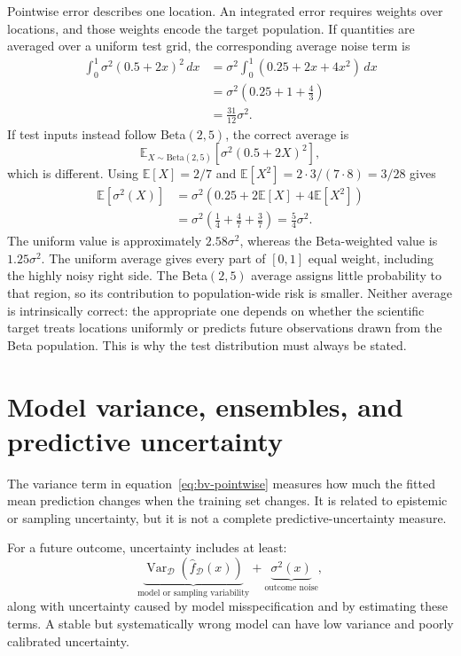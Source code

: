\documentclass[11pt,a4paper]{article}
\begin{document}
Pointwise error describes one location. An integrated error requires weights over locations, and those weights encode the target population. If quantities are averaged over a uniform test grid, the corresponding average noise term is
\begin{align}
  \int_0^1 \sigma^2(0.5+2x)^2\,dx
  &=\sigma^2\int_0^1(0.25+2x+4x^2)\,dx\\
  &=\sigma^2\left(0.25+1+\frac{4}{3}\right)\\
  &=\frac{31}{12}\sigma^2.
  \label{eq:uniform-hetero-noise}
\end{align}
If test inputs instead follow Beta$(2,5)$, the correct average is
\[
  \mathbb E_{X\sim\mathrm{Beta}(2,5)}
  \left[\sigma^2(0.5+2X)^2\right],
\]
which is different. Using $\mathbb E[X]=2/7$ and $\mathbb E[X^2]=2\cdot3/(7\cdot8)=3/28$ gives
\begin{align}
  \mathbb E[\sigma^2(X)]
  &=\sigma^2\left(0.25+2\mathbb E[X]+4\mathbb E[X^2]\right)\\
  &=\sigma^2\left(\frac14+\frac47+\frac37\right)
  =\frac54\sigma^2.
\end{align}
The uniform value is approximately $2.58\sigma^2$, whereas the Beta-weighted value is $1.25\sigma^2$. The uniform average gives every part of $[0,1]$ equal weight, including the highly noisy right side. The Beta$(2,5)$ average assigns little probability to that region, so its contribution to population-wide risk is smaller. Neither average is intrinsically correct: the appropriate one depends on whether the scientific target treats locations uniformly or predicts future observations drawn from the Beta population. This is why the test distribution must always be stated.

\section{Model variance, ensembles, and predictive uncertainty}

The variance term in equation~\eqref{eq:bv-pointwise} measures how much the fitted mean prediction changes when the training set changes. It is related to epistemic or sampling uncertainty, but it is not a complete predictive-uncertainty measure.

For a future outcome, uncertainty includes at least:
\begin{equation}
  \underbrace{\operatorname{Var}_{\mathcal D}(\widehat f_{\mathcal D}(x))}_{\text{model or sampling variability}}
  +\underbrace{\sigma^2(x)}_{\text{outcome noise}},
\end{equation}
along with uncertainty caused by model misspecification and by estimating these terms. A stable but systematically wrong model can have low variance and poorly calibrated uncertainty.
\end{document}
